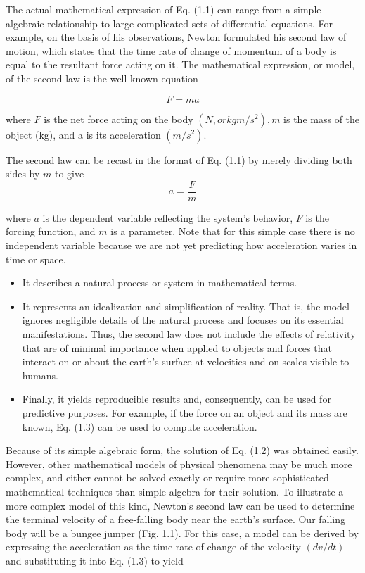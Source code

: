 \documentclass[../main.tex]{subfiles}
\begin{document}
The actual mathematical expression of Eq. (1.1) can range from a simple algebraic
relationship to large complicated sets of differential equations. For example, on the basis of
his observations, Newton formulated his second law of motion, which states that the time
rate of change of momentum of a body is equal to the resultant force acting on it. The mathematical expression, or model, of the second law is the well-known equation

\begin{equation}
\tag{1.2}
F=ma
\end{equation}

where $F$ is the net force acting on the body $(N, or kg m/s^2
), m$ is the mass of the object (kg),
and a is its acceleration $(m/s^2
)$.

The second law can be recast in the format of Eq. (1.1) by merely dividing both sides
by $m$ to give
\begin{equation}
\tag{1.3}
a=\dfrac{F}{m}
\end{equation}

where $a$ is the dependent variable reflecting the system's behavior, $F$ is the forcing function, and $m$ is a parameter. Note that for this simple case there is no independent variable
because we are not yet predicting how acceleration varies in time or space.

\begin{itemize}
\item  It describes a natural process or system in mathematical terms.
\item It represents an idealization and simplification of reality. That is, the model ignores negligible details of the natural process and focuses on its essential manifestations. Thus,
the second law does not include the effects of relativity that are of minimal importance
when applied to objects and forces that interact on or about the earth’s surface at velocities and on scales visible to humans.
\item  Finally, it yields reproducible results and, consequently, can be used for predictive purposes. For example, if the force on an object and its mass are known, Eq. (1.3) can be
used to compute acceleration.

\end{itemize}


Because of its simple algebraic form, the solution of Eq. (1.2) was obtained easily.
However, other mathematical models of physical phenomena may be much more complex,
and either cannot be solved exactly or require more sophisticated mathematical techniques
than simple algebra for their solution. To illustrate a more complex model of this kind,
Newton’s second law can be used to determine the terminal velocity of a free-falling body
near the earth’s surface. Our falling body will be a bungee jumper (Fig. 1.1). For this case,
a model can be derived by expressing the acceleration as the time rate of change of the
velocity $(dv/dt)$ and substituting it into Eq. (1.3) to yield
\end{document}
